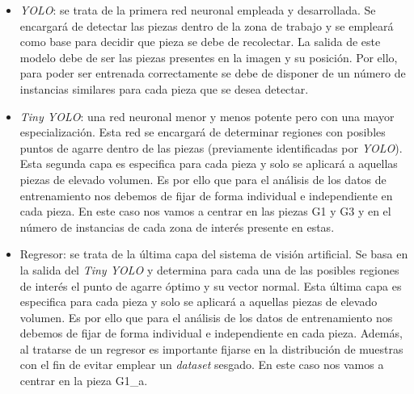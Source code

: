 \begin{itemize}
\item \textit{YOLO}: se trata de la primera red neuronal empleada y desarrollada. Se encargará de detectar las piezas dentro de la zona de trabajo y se empleará como base para decidir que pieza se debe de recolectar. La salida de este modelo debe de ser las piezas presentes en la imagen y su posición. Por ello, para poder ser entrenada correctamente se debe de disponer de un número de instancias similares para cada pieza que se desea detectar.

\item \textit{Tiny YOLO}: una red neuronal menor y menos potente pero con una mayor especialización. Esta red se encargará de determinar regiones con posibles puntos de agarre dentro de las piezas (previamente identificadas por \textit{YOLO}). Esta segunda capa es especifica para cada pieza y solo se aplicará a aquellas piezas de elevado volumen. Es por ello que para el análisis de los datos de entrenamiento nos debemos de fijar de forma individual e independiente en cada pieza. En este caso nos vamos a centrar en las piezas G1 y G3 y en el número de instancias de cada zona de interés presente en estas.

\item Regresor: se trata de la última capa del sistema de visión artificial. Se basa en la salida del \textit{Tiny YOLO} y determina para cada una de las posibles regiones de interés el punto de agarre óptimo y su vector normal. Esta última capa es especifica para cada pieza y solo se aplicará a aquellas piezas de elevado volumen. Es por ello que para el análisis de los datos de entrenamiento nos debemos de fijar de forma individual e independiente en cada pieza. Además, al tratarse de un regresor es importante fijarse en la distribución de muestras con el fin de evitar emplear un \textit{dataset} sesgado. En este caso nos vamos a centrar en la pieza G1\_a.
\end{itemize}

